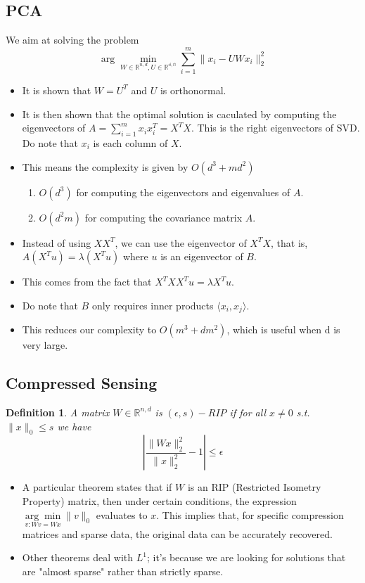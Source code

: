 \documentclass[11pt,reqno]{amsart}
\newtheorem{definition}{Definition}
\theoremstyle{remark}
\begin{document}
\subsection*{PCA}
We aim at solving the problem 
\[
\arg\min_{W\in\mathbb{R}^{n,d}, U\in\mathbb{R^{d,n}}}\sum^m_{i=1}\lVert x_i-UWx_i\rVert^2_2
\]
\begin{itemize}
\item It is shown that $W=U^T$ and $U$ is orthonormal.
\item It is then shown that the optimal solution is caculated by computing the eigenvectors of $A=\sum^m_{i=1}x_ix_i^T=X^TX$. 
This is the right eigenvectors of SVD. Do note that $x_i$ is each column of $X$.
\item This means the complexity is given by $O(d^3+md^2)$
\begin{enumerate}
\item $O(d^3)$ for computing the eigenvectors and eigenvalues of $A$.
\item $O(d^2 m)$ for computing the covariance matrix $A$.
\end{enumerate}
\item Instead of using $XX^T$, we can use the eigenvector of $X^TX$, that is, 
$A(X^Tu)=\lambda(X^T u)$ where $u$ is an eigenvector of $B$.
\item This comes from the fact that $X^T XX^T u=\lambda X^T u$.
\item Do note that $B$ only requires inner products $\langle x_i,x_j\rangle$.
\item This reduces our complexity to $O(m^3+dm^2)$, which is useful when d is very large.
\end{itemize}
\subsection*{Compressed Sensing}
\begin{definition}
A matrix $W\in \mathbb{R}^{n,d}$ is $(\epsilon, s)-RIP$ if for all $x\neq 0$ s.t. $\lVert x\rVert_0\leq s$
 we have 
 \[
|\frac{\lVert Wx\rVert^2_2}{\lVert x\rVert^2_2}-1|\leq \epsilon
 \]
\end{definition}
\begin{itemize}
\item A particular theorem states that if $W$ is an RIP (Restricted Isometry Property) matrix, 
then under certain conditions, the expression $\underset{v:Wv=Wx}{\arg\min} \lVert v\rVert_0$ evaluates to $x$. 
This implies that, for specific compression matrices and sparse data, the original data 
can be accurately recovered.
\item Other theorems deal with $L^1$; it's because we are looking for
 solutions that are "almost sparse" rather than strictly sparse.
\end{itemize}
\end{document}
